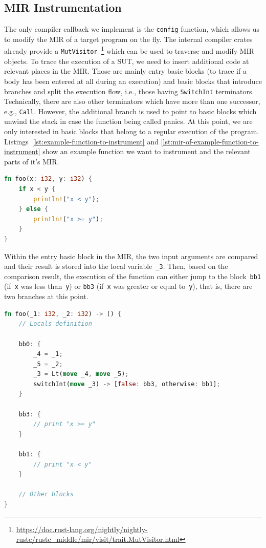 \documentclass{article}
\begin{document}
\subsection{MIR Instrumentation}
The only compiler callback we implement is the \lstinline{config} function, which allows us to modify the \ac{MIR} of a target program on the fly. The internal compiler crates already provide a \lstinline{MutVisitor}~\footnote{\url{https://doc.rust-lang.org/nightly/nightly-rustc/rustc_middle/mir/visit/trait.MutVisitor.html}} which can be used to traverse and modify \ac{MIR} objects. To trace the execution of a \ac{SUT}, we need to insert additional code at relevant places in the \ac{MIR}. Those are mainly entry basic blocks (to trace if a body has been entered at all during an execution) and basic blocks that introduce branches and split the execution flow, i.e., those having \lstinline{SwitchInt} terminators. Technically, there are also other terminators which have more than one successor, e.g., \lstinline{Call}. However, the additional branch is used to point to basic blocks which unwind the stack in case the function being called panics. At this point, we are only interested in basic blocks that belong to a regular execution of the program. Listings~\ref{lst:example-function-to-instrument} and \ref{lst:mir-of-example-function-to-instrument} show an example function we want to instrument and the relevant parts of it's \ac{MIR}.

\begin{lstlisting}[language=Rust, style=boxed, caption={Example function to instrument}, label=lst:example-function-to-instrument]
fn foo(x: i32, y: i32) {
    if x < y {
        println!("x < y");
    } else {
        println!("x >= y");
    }
}
\end{lstlisting}

Within the entry basic block in the \ac{MIR}, the two input arguments are compared and their result is stored into the local variable~\lstinline{_3}. Then, based on the comparison result, the execution of the function can either jump to the block~\lstinline{bb1} (if~\lstinline{x} was less than~\lstinline{y}) or \lstinline{bb3} (if~\lstinline{x} was greater or equal to~\lstinline{y}), that is, there are two branches at this point. 
\begin{lstlisting}[language=Rust, style=boxed, caption={MIR of the \lstinline{foo} function}, label=lst:mir-of-example-function-to-instrument]
fn foo(_1: i32, _2: i32) -> () {
    // Locals definition

    bb0: {
        _4 = _1;                         
        _5 = _2;                       
        _3 = Lt(move _4, move _5);      
        switchInt(move _3) -> [false: bb3, otherwise: bb1]; 
    }

    bb3: {
        // print "x >= y"
    }

    bb1: {
        // print "x < y"
    }

    // Other blocks
}
\end{lstlisting}
\end{document}
